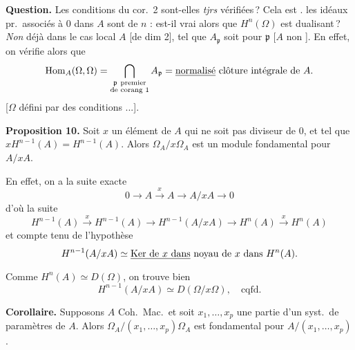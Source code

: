 \documentclass[11pt,a4paper]{article}
\begin{document}
\textbf{Question.} Les conditions du cor.\ 2 sont-elles \emph{tjrs}
vérifiées\,? Cela est .  \ill{}  les idéaux
pr.\ associés à $0$ dans $A$ sont de \struck{\ill{}} 
$n$ : est-il vrai alors que $H^n(\Omega)$ est dualisant\,?
\emph{Non} déjà \add{\ill{} \struck{\ill{}} \ill{} \ill{}} dans le cas
\struck{\ill{} \ill{} \ill{} \ill{} \ill{}} local
 $A$ [de dim 2], tel que $A_{\mathfrak{p}}$ soit
 pour $\mathfrak{p}$ \struck{\ill{}}
[$A$ non ]. En effet, \struck{\ill{}} on vérifie alors que
\[
  \mathrm{Hom}_A(\Omega, \Omega) = \bigcap_{\substack{\mathfrak{p}\ \text{premier}\\
  \text{de corang 1}}} A_{\mathfrak{p}} =
  \struck{\text{normalisé}}\ \text{clôture intégrale de } A .
\]
[$\Omega$  défini par des conditions \ill{} ...].


\textbf{Proposition 10.} Soit $x$ un élément de $A$ qui ne soit pas diviseur
de $0$, et tel que $x H^{n-1}(A) = H^{n-1}(A)$. Alors
$\Omega_A / x\Omega_A$ est un module fondamental pour $A/xA$.

En effet, on a la suite exacte
\[
  0 \longrightarrow A \xrightarrow{\ x\ } A \longrightarrow A/xA
  \longrightarrow 0
\]
d'où la suite
\[
  H^{n-1}(A) \xrightarrow{\ x\ } H^{n-1}(A) \longrightarrow H^{n-1}(A/xA)
  \longrightarrow H^n(A) \xrightarrow{\ x\ } H^n(A)
\]
et compte tenu de l'hypothèse
\[
  H^{n-1}(A/xA) \simeq \struck{\mathrm{Ker}\ \text{de}\ x\ \text{dans}}\
  \text{noyau de } x \text{ dans } H^n(A) .
\]
Comme $H^n(A) \simeq D(\Omega)$, on trouve bien
\[
  H^{n-1}(A/xA) \simeq D(\Omega/x\Omega) , \quad \text{cqfd.}
\]

\textbf{Corollaire.} Supposons $A$ Coh.\ Mac.\ et soit $x_1, \ldots, x_p$
une partie d'un syst.\ de paramètres de $A$. Alors
$\Omega_A / (x_1, \ldots, x_p)\Omega_A$ est fondamental pour
$A/(x_1, \ldots, x_p)$.
\end{document}
